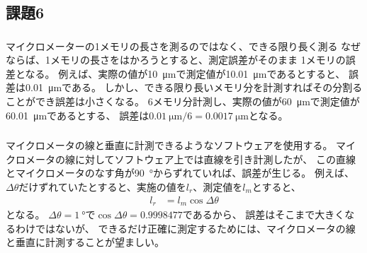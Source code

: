 \subsection{課題6}

\subsubsection{}
マイクロメーターの1メモリの長さを測るのではなく、できる限り長く測る
なぜならば、1メモリの長さをはかろうとすると、測定誤差がそのまま
1メモリの誤差となる。
例えば、実際の値が\SI{10}{\micro\meter}で測定値が\SI{10.01}{\micro\meter}であるとすると、
誤差は\SI{0.01}{\micro\meter}である。
しかし、できる限り長いメモリ分を計測すればその分割ることができ誤差は小さくなる。
6メモリ分計測し、実際の値が\SI{60}{\micro\meter}で測定値が\SI{60.01}{\micro\meter}であるとする、
誤差は$\SI{0.01}{\micro\meter} / 6 = \SI{0.0017}{\micro\meter}$となる。

\subsubsection{}
マイクロメータの線と垂直に計測できるようなソフトウェアを使用する。
マイクロメータの線に対してソフトウェア上では直線を引き計測したが、
この直線とマイクロメータのなす角が\SI{90}{\degree}からずれていれば、誤差が生じる。
例えば、$\Delta \theta$だけずれていたとすると、実施の値を$l_r$、測定値を$l_m$とすると、
\begin{align*}
    l_r & = l_m \cos \Delta \theta
\end{align*}
となる。
$\Delta \theta=\SI{1}{\degree}$で$\cos\Delta\theta = 0.9998477$であるから、
誤差はそこまで大きくなるわけではないが、
できるだけ正確に測定するためには、マイクロメータの線と垂直に計測することが望ましい。
